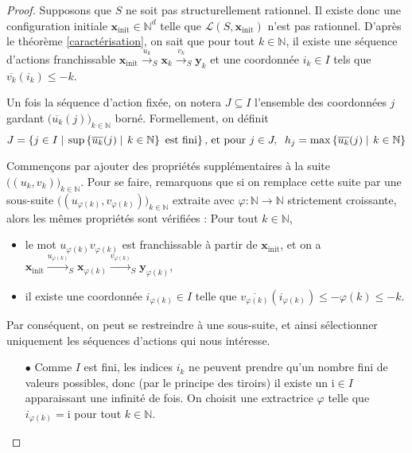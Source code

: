 \documentclass[a4paper,final]{article}
\theoremstyle{definition}
\let\phi\varphi
\let\leq\leqslant
\newcommand{\alain}[1]{\textcolor{blue}{#1}}
\newcommand{\set}[2]{\left\{#1\mathrel{\left|\vphantom{#1}\vphantom{#2}\right.}#2\right\}}
\newcommand{\N}{\ensuremath{\mathbb{N}}}
\newcommand{\lang}{\ensuremath{\mathcal{L}}}
\newcommand{\trans}[2]{\ensuremath{\stackrel{#1}{\longrightarrow}_{#2}}}
\newcommand{\vect}[1]{\ensuremath{\mathbf{#1}}}
\newcommand{\xinit}{\ensuremath{\vect{x}_\text{init}}}
\newcommand{\valeur}[1]{\ensuremath{\overline{#1}}}
\begin{document}
\begin{proof}
Supposons que $S$ ne soit pas structurellement rationnel.
Il existe donc une configuration initiale $\xinit \in\N^d$ telle que $\lang(S,\xinit)$ n'est pas rationnel.
D'après le théorème \ref{caractérisation}, on sait que pour tout $k\in\N$,  il existe une séquence d'actions franchissable 
$\xinit \trans{u_k}{S} \vect{x}_k \trans{v_k}{S} \vect{y}_k$
et une coordonnée $i_k \in I$ tels que $\valeur{v_k}(i_k) \leq -k$.

Un fois la séquence d'action fixée, on notera $J\subseteq I$ l'ensemble des coordonnées $j$ gardant $\big( \valeur{u_k}(j) \big)_{k\in\N}$ borné.
Formellement, on définit 
$$J = \set{j\in I}{
    \text{sup} \set{\valeur{u_k}(j)}{k\in\N} \text{ est fini}}
\text{, et pour } j\in J,\hspace{2mm} h_j = \max \set{\valeur{u_k}(j)}{k\in\N}$$

Commençons par ajouter des propriétés supplémentaires à la suite $\big((u_k,v_k)\big)_{k\in\N}$.
Pour se faire, remarquons que si on remplace cette suite par une sous-suite $\big( (u_{\phi(k)}, v_{\phi(k)}) \big) _{k\in\N}$ extraite avec $\phi:\N\to\N$ strictement croissante, 
alors les mêmes propriétés sont vérifiées :
Pour tout $k\in\N$,
\begin{itemize}
    \item le mot $u_{\phi(k)} v_{\phi(k)}$ est franchissable à partir de $\xinit$, et on a $\xinit \trans{u_{\phi(k)}}{S} \vect{x}_{\phi(k)} \trans{v_{\phi(k)}}{S} \vect{y}_{\phi(k)}$,
    \item il existe une coordonnée $i_{\phi(k)} \in I$ telle que $\valeur{v_{\phi(k)}}(i_{\phi(k)}) \leq -\phi(k) \leq -k$.
\end{itemize}
Par conséquent, on peut se restreindre à une sous-suite, et ainsi sélectionner uniquement les séquences d'actions qui nous intéresse.

\begin{itemize}
    \item[$\bullet$] Comme $I$ est fini, les indices $i_k$ ne peuvent prendre qu'un nombre fini de valeurs possibles, donc (par le principe des tiroirs) il existe un $\mathrm{i}\in I$ apparaissant une infinité de fois.
    On choisit une extractrice $\phi$ telle que $i_{\phi(k)} = \mathrm{i}$ pour tout $k\in\N$.
    

\end{itemize}
\end{proof}
\end{document}
